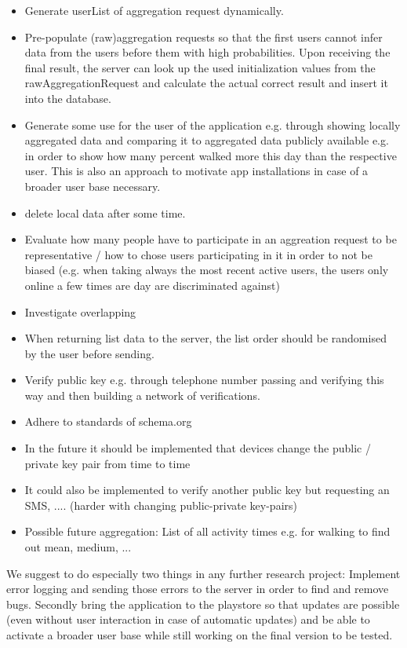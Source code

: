 \begin{itemize}
	\item Generate userList of aggregation request dynamically.
	\item Pre-populate (raw)aggregation requests so that the first users cannot infer data from the users before them with high probabilities. Upon receiving the final result, the server can look up the used initialization values from the rawAggregationRequest and calculate the actual correct result and insert it into the database.
	\item Generate some use for the user of the application e.g. through showing locally aggregated data and comparing it to aggregated data publicly available e.g. in order to show how many percent walked more this day than the respective user. This is also an approach to motivate app installations in case of a broader user base necessary.
	\item delete local data after some time.
	\item Evaluate how many people have to participate in an aggreation request to be representative / how to chose users participating in it in order to not be biased (e.g. when taking always the most recent active users, the users only online a few times are day are discriminated against)
	\item Investigate overlapping
	\item When returning list data to the server, the list order should be randomised by the user before sending.
	\item Verify public key e.g. through telephone number passing and verifying this way and then building a network of verifications.
	\item Adhere to standards of schema.org
	\item In the future it should be implemented that devices change the public / private key pair from time to time
	\item It could also be implemented to verify another public key but requesting an SMS, .... (harder with changing public-private key-pairs)
	\item Possible future aggregation: List of all activity times e.g. for walking to find out mean, medium, ...
\end{itemize}
We suggest to do especially two things in any further research project: Implement error logging and sending those errors to the server in order to find and remove bugs. Secondly bring the application to the playstore so that updates are possible (even without user interaction in case of automatic updates) and be able to activate a broader user base while still working on the final version to be tested.

